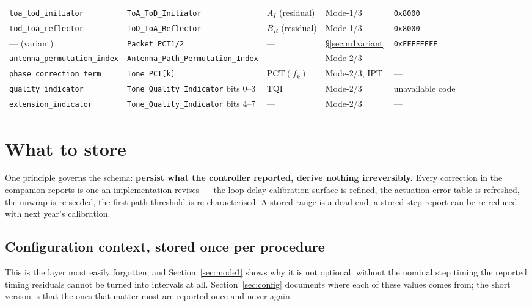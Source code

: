 \documentclass[11pt,a4paper]{article}
\newcommand{\code}[1]{\texttt{\small #1}}
\newcommand{\PCT}{\ensuremath{\mathrm{PCT}}}
\newcommand{\TQI}{\ensuremath{\mathrm{TQI}}}
\newcommand{\IPT}{\ensuremath{\mathrm{IPT}}}
\begin{document}
\begin{table}[htb]
\begin{tabular}{@{}L{31mm}L{31mm}L{24mm}L{18mm}L{28mm}@{}}
\code{toa\_\allowbreak{}tod\_\allowbreak{}initiator} & \code{ToA\_\allowbreak{}ToD\_\allowbreak{}Initiator} & $A_I$ (residual) & Mode-1/3 & \code{0x8000} \\
\code{tod\_\allowbreak{}toa\_\allowbreak{}reflector} & \code{ToD\_\allowbreak{}ToA\_\allowbreak{}Reflector} & $B_R$ (residual) & Mode-1/3 & \code{0x8000} \\
--- (variant) & \code{Packet\_\allowbreak{}PCT1/2} & --- & \S\ref{sec:m1variant} & \code{0xFFFFFFFF} \\
\code{antenna\_\allowbreak{}permutation\_\allowbreak{}index} & \code{Antenna\_\allowbreak{}Path\_\allowbreak{}Permutation\_\allowbreak{}Index} & --- & Mode-2/3 & --- \\
\code{phase\_\allowbreak{}correction\_\allowbreak{}term} & \code{Tone\_\allowbreak{}PCT[k]} & $\PCT(f_k)$ & Mode-2/3, \IPT & --- \\
\code{quality\_\allowbreak{}indicator} & \code{Tone\_\allowbreak{}Quality\_\allowbreak{}Indicator} bits 0--3 & $\TQI$ & Mode-2/3 & unavailable code \\
\code{extension\_\allowbreak{}indicator} & \code{Tone\_\allowbreak{}Quality\_\allowbreak{}Indicator} bits 4--7 & --- & Mode-2/3 & --- \\
\bottomrule
\end{tabular}
\end{table}
\section{What to store}
\label{sec:store}

One principle governs the schema: \textbf{persist what the controller reported, derive nothing
irreversibly.} Every correction in the companion reports is one an implementation revises --- the
loop-delay calibration surface is refined, the actuation-error table is refreshed, the unwrap is
re-seeded, the first-path threshold is re-characterised. A stored range is a dead end; a stored step
report can be re-reduced with next year's calibration.

\subsection{Configuration context, stored once per procedure}

This is the layer most easily forgotten, and Section~\ref{sec:mode1} shows why it is not optional:
without the nominal step timing the reported timing residuals cannot be turned into intervals at all.
Section~\ref{sec:config} documents where each of these values comes from; the short version is that
the ones that matter most are reported once and never again.
\end{document}
